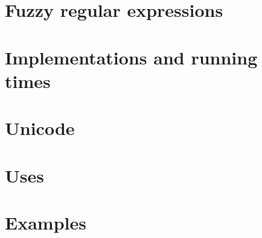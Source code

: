 \chapter{Fuzzy regular expressions}







\chapter{Implementations and running times}





\chapter{Unicode}







\chapter{Uses}






\chapter{Examples}






























































\clearpage